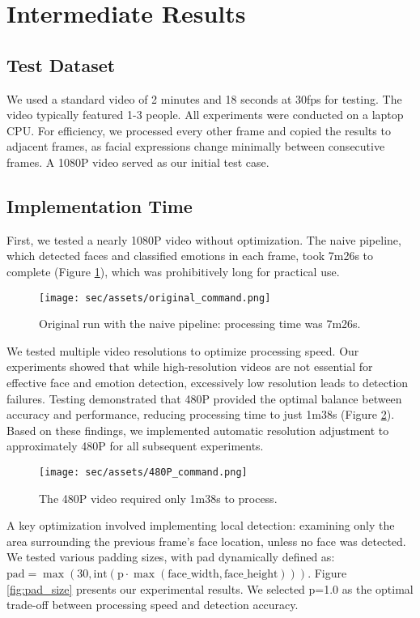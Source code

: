 \section{Intermediate Results}
\subsection{Test Dataset}
We used a standard video of 2 minutes and 18 seconds at 30fps for testing. The video typically featured 1-3 people. All experiments were conducted on a laptop CPU. For efficiency, we processed every other frame and copied the results to adjacent frames, as facial expressions change minimally between consecutive frames. A 1080P video served as our initial test case.

\subsection{Implementation Time}
First, we tested a nearly 1080P video without optimization. The naive pipeline, which detected faces and classified emotions in each frame, took 7m26s to complete (Figure \ref{fig:original_command}), which was prohibitively long for practical use.
\begin{figure}[!htb]
	\centering
	 \texttt{[image: sec/assets/original\_command.png]}
	 \caption{Original run with the naive pipeline: processing time was 7m26s.}
	 \label{fig:original_command}
\end{figure}

We tested multiple video resolutions to optimize processing speed. Our experiments showed that while high-resolution videos are not essential for effective face and emotion detection, excessively low resolution leads to detection failures. Testing demonstrated that 480P provided the optimal balance between accuracy and performance, reducing processing time to just 1m38s (Figure \ref{fig:480P_command}). Based on these findings, we implemented automatic resolution adjustment to approximately 480P for all subsequent experiments.
\begin{figure}[!htb]
	\centering
	 \texttt{[image: sec/assets/480P\_command.png]}
	 \caption{The 480P video required only 1m38s to process.}
	 \label{fig:480P_command}
\end{figure}

A key optimization involved implementing local detection: examining only the area surrounding the previous frame's face location, unless no face was detected. We tested various padding sizes, with pad dynamically defined as: $\text{pad} = \max(30, \text{int}(\text{p} \cdot \max(\text{face\_width}, \text{face\_height})))$. Figure \ref{fig:pad_size} presents our experimental results. We selected p=1.0 as the optimal trade-off between processing speed and detection accuracy.

